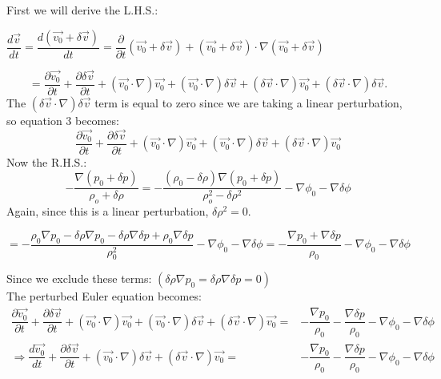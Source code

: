 \documentclass[a4paper]{article}
\begin{document}
\noindent First we will derive the L.H.S.:\\

\begin{center}
$\dfrac{d\vec{v}}{dt} = \dfrac{d(\vec{v_0}+\delta \vec{v})}{dt} = \dfrac{\partial}{\partial t}(\vec{v_0} + \delta \vec{v}) + (\vec{v_0}+\delta \vec{v}) \cdot \nabla (\vec{v_0}+\delta \vec{v})$
\end{center}

\begin{equation}
= \dfrac{\partial \vec{v_0}}{\partial t} + \dfrac{\partial \delta \vec{v}}{\partial t} + (\vec{v_0} \cdot \nabla) \vec{v_0} + (\vec{v_0} \cdot \nabla)\delta \vec{v} + (\delta \vec{v} \cdot \nabla)\vec{v_0} + (\delta \vec{v} \cdot \nabla)\delta \vec{v}.
\label{eq:3} 
\end{equation}
\noindent The $(\delta \vec{v} \cdot \nabla) \delta \vec{v}$ term is equal to zero since we are taking a linear perturbation, so equation 3 becomes:\\
\begin{equation}
\dfrac{\partial \vec{v_0}}{\partial t} + \dfrac{\partial \delta \vec{v}}{\partial t} + (\vec{v_0} \cdot \nabla) \vec{v_0} + (\vec{v_0} \cdot \nabla)\delta \vec{v} + (\delta \vec{v} \cdot \nabla)\vec{v_0}
\label{eq:4}
\end{equation}
\noindent Now the R.H.S.:\\

\begin{equation}
- \dfrac{\nabla(p_0 + \delta p)}{\rho_o + \delta \rho} = - \dfrac{(\rho_0-\delta \rho) \nabla(p_0 + \delta p)}{\rho_o^2 - \delta \rho^2} - \nabla \phi_0 - \nabla \delta \phi 
\label{eq:5}
\end{equation}
Again, since this is a linear perturbation, $\delta \rho^2 = 0$.

\begin{center}
$= -\dfrac{\rho_0 \nabla p_0 - \delta \rho \nabla p_0 - \delta \rho \nabla \delta p + \rho_0 \nabla \delta p}{\rho_0^2}  - \nabla \phi_0 - \nabla \delta \phi  = - \dfrac{\nabla p_0 + \nabla \delta p}{\rho_0} - \nabla \phi_0 - \nabla \delta \phi$
\end{center}
Since we exclude these terms: $(\delta \rho \nabla p_0 = \delta \rho \nabla \delta p = 0)$\\
The perturbed Euler equation becomes:
\begin{align*}
\dfrac{\partial \vec{v_0}}{\partial t} + \dfrac{\partial \delta \vec{v}}{\partial t} + (\vec{v_0} \cdot \nabla) \vec{v_0} + (\vec{v_0} \cdot \nabla)\delta \vec{v} + (\delta \vec{v} \cdot \nabla)\vec{v_0} =& - \dfrac{\nabla p_0}{\rho_0} - \dfrac{\nabla \delta p}{\rho_0} - \nabla \phi_0 - \nabla \delta \phi\\
\Rightarrow \dfrac{d \vec{v_0}}{dt} + \dfrac{\partial \delta \vec{v}}{\partial t} + (\vec{v_0} \cdot \nabla)\delta \vec{v} + (\delta \vec{v} \cdot \nabla)\vec{v_0} =& - \dfrac{\nabla p_0}{\rho_0} - \dfrac{\nabla \delta p}{\rho_0} - \nabla \phi_0 - \nabla \delta \phi
\end{align*}
\end{document}
